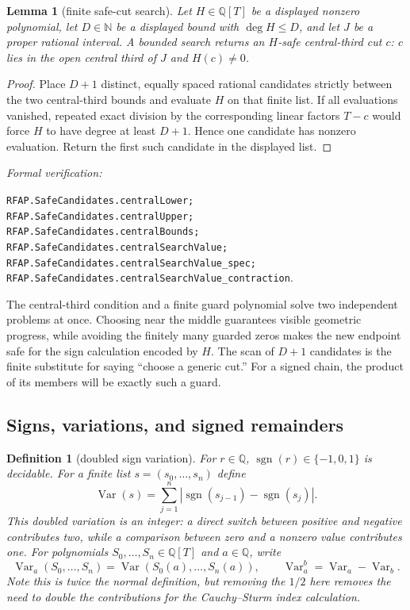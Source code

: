 \documentclass[11pt]{article}
\newtheorem{lemma}[theorem]{Lemma}
\newtheorem{definition}[theorem]{Definition}
\newcommand{\Q}{\mathbb{Q}}
\newcommand{\N}{\mathbb{N}}
\newcommand{\Var}{\operatorname{Var}}
\newcommand{\leanref}[1]{\par\smallskip\noindent
  \emph{Formal verification:}\par\nobreak
  {\raggedright\nolinkurl{#1}.\par}}
\begin{document}
\begin{lemma}[finite safe-cut search]
\label{lem:safe-central-third-cut}
Let $H\in\Q[T]$ be a displayed nonzero polynomial, let $D\in\N$ be a
displayed bound with $\deg H\le D$, and let $J$ be a proper rational
interval.  A bounded search returns an $H$-safe central-third cut $c$:
$c$ lies in the open central third of $J$ and $H(c)\ne0$.
\end{lemma}

\begin{proof}
Place $D+1$ distinct, equally spaced rational candidates strictly between
the two central-third bounds and evaluate $H$ on that finite list.  If all
evaluations vanished, repeated exact division by the corresponding linear
factors $T-c$ would force $H$ to have degree at least $D+1$.  Hence one
candidate has nonzero evaluation.  Return the first such candidate in the
displayed list.
\end{proof}

\leanref{RFAP.SafeCandidates.centralLower;
RFAP.SafeCandidates.centralUpper;
RFAP.SafeCandidates.centralBounds;
RFAP.SafeCandidates.centralSearchValue;
RFAP.SafeCandidates.centralSearchValue_spec;
RFAP.SafeCandidates.centralSearchValue_contraction}

The central-third condition and a finite guard polynomial solve two
independent problems at once.  Choosing near the middle guarantees visible
geometric progress, while avoiding the finitely many guarded zeros makes the
new endpoint safe for the sign calculation encoded by $H$.  The scan of
$D+1$ candidates is the finite substitute for saying ``choose a generic
cut.''  For a signed chain, the product of its members will be exactly such
a guard.

\subsection{Signs, variations, and signed remainders}

\begin{definition}[doubled sign variation]
\label{def:sign-variation}
For $r\in\Q$, $\operatorname{sgn}(r)\in\{-1,0,1\}$ is decidable.  For a
finite list $s=(s_0,\dots,s_n)$ define
\begin{equation}
\label{eq:variation}
 \Var(s)=\sum_{j=1}^{n}|\operatorname{sgn}(s_{j-1})-
                                  \operatorname{sgn}(s_j)|.
\end{equation}
This doubled variation is an integer: a direct switch between positive and
negative contributes two, while a comparison between zero and a nonzero
value contributes one.  For polynomials $S_0,\dots,S_n\in\Q[T]$ and
$a\in\Q$, write
\[
 \Var_a(S_0,\dots,S_n)=\Var(S_0(a),\dots,S_n(a)),\qquad
 \Var_a^b=\Var_a-\Var_b.
\]
Note this is twice the normal definition, but removing the $1/2$ here removes the
need to double the contributions for the Cauchy--Sturm index calculation.
\end{definition}
\end{document}
